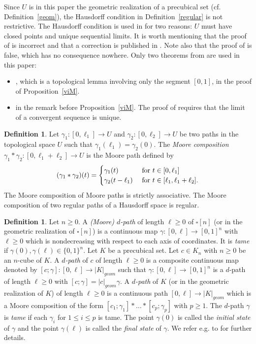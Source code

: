 \documentclass[a4paper,12pt]{amsart}
\theoremstyle{definition}
\newtheorem{defn}[thm]{Definition}
\newcommand{\bd}{\begin{defn}}
\newcommand{\ed}{\end{defn}}
\renewcommand{\leq}{\leqslant}
\renewcommand{\geq}{\geqslant}
\begin{document}
Since $U$ is in this paper the geometric realization of a precubical set (cf. Definition~\ref{geom}), the Hausdorff condition in Definition~\ref{regular} is not restrictive. The Hausdorff condition is used in \cite{reparam} for two reasons: $U$ must have closed points and unique sequential limits. It is worth mentioning that the proof of \cite[Proposition~3.7]{reparam} is incorrect and that a correction is published in \cite{reparam-fixed}. Note also that the proof of \cite[Corollary~3.5]{reparam} is false, which has no consequence nowhere. Only two theorems from \cite{reparam} are used in this paper: 
\begin{itemize}[leftmargin=*]
	\item \cite[Proposition~2.22]{reparam}, which is a topological lemma involving only the segment $[0,1]$, in the proof of Proposition~\ref{viM}.
	\item \cite[Proposition~3.8]{reparam} in the remark before  Proposition~\ref{viM}. The proof of \cite[Proposition~3.8]{reparam} requires that the limit of a convergent sequence is unique.
\end{itemize}


\bd
Let $\gamma_1:[0,\ell_1]\to U$ and $\gamma_2:[0,\ell_2]\to U$ be two paths in the topological space $U$ such that $\gamma_1(\ell_1)=\gamma_2(0)$. The \textit{Moore composition} $\gamma_1*\gamma_2:[0,\ell_1+\ell_2]\to U$ is the Moore path defined by 
\[
(\gamma_1*\gamma_2)(t)=
\begin{cases}
\gamma_1(t) & \hbox{ for } t\in [0,\ell_1]\\
\gamma_2(t-\ell_1) &\hbox{ for }t\in [\ell_1,\ell_1+\ell_2].
\end{cases}
\]
The Moore composition of Moore paths is strictly associative. The Moore composition of two regular paths of a Hausdorff space is regular.
\ed

\bd \label{def-dpath}
Let $n\geq 0$. A \textit{(Moore) $d$-path} of length $\ell\geq 0$ of $\square[n]$ (or in the geometric realization of $\square[n]$) is a continuous map $\gamma:[0,\ell]\to [0,1]^n$ with $\ell\geq 0$ which is nondecreasing with respect to each axis of coordinates. It is \textit{tame} if $\gamma(0),\gamma(\ell)\in \{0,1\}^n$. Let $K$ be a precubical set. Let $c\in K_n$ with $n\geq 0$ be an $n$-cube of $K$. A \textit{$d$-path} of $c$ of length $\ell \geq 0$ is a composite continuous map denoted by $[c;\gamma]:[0,\ell] \to |K|_{geom}$ such that $\gamma:[0,\ell]\to [0,1]^n$ is a $d$-path of length $\ell\geq 0$ with $[c;\gamma]=|c|_{geom}\gamma$. A \textit{$d$-path} of $K$ (or in the geometric realization of $K$) of length $\ell\geq 0$ is a continuous path $[0,\ell] \to |K|_{geom}$ which is a Moore composition of the form $[c_1;\gamma_1] * \dots *[c_p;\gamma_p]$ with $p\geq 1$. The $d$-path $\gamma$ is \textit{tame} if each $\gamma_i$ for $1\leq i\leq p$ is tame. The point $\gamma(0)$ is called the \textit{initial state} of $\gamma$ and the point $\gamma(\ell)$ is called the \textit{final state} of $\gamma$. We refer e.g. to \cite[Section~2.1 and Section~2.5]{MR4070250} for further details. 
\ed 
\end{document}
